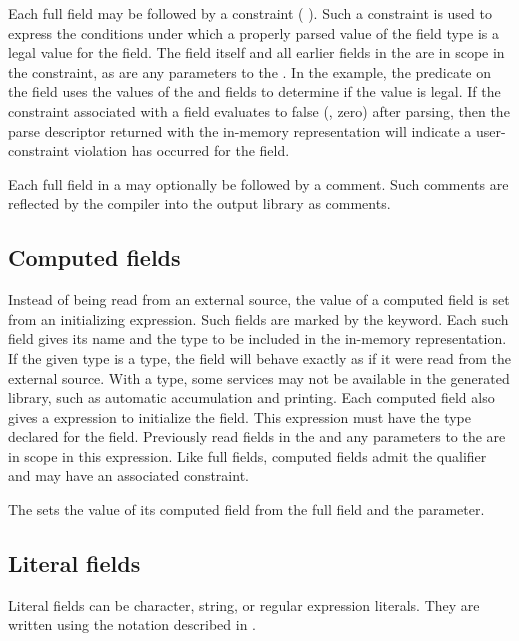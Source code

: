 Each full field may be followed by a constraint (\cf{}
).  Such a constraint is used to express
the conditions under which a properly parsed value of the field type
is a legal value for the field.  The field itself and all earlier
fields in the \Pstruct{} are in scope in the constraint, as are any
parameters to the \Pstruct{}.  In the example, the 
predicate on the  field uses the values of the 
and  fields to determine if the  value is
legal. 
If the constraint associated with a field evaluates to false
(\ie{}, zero) after parsing, then the parse descriptor returned with
the in-memory representation will indicate a user-constraint violation
has occurred for the field.

Each full field in a \Pstruct{} may optionally be followed by a \PADSL{}
comment. Such comments are reflected by the \PADS{} compiler into the
output library as comments. 

\subsection{Computed fields}
\label{sec:structs-computed-fields}
Instead of being read from an external source, the value of a
computed field is set from an initializing expression.  Such fields
are marked by the \Pcompute{} keyword.  Each such field gives its name
and the type to be included in the in-memory representation.  
If the given type is a \pads{} type, the field will behave exactly as
if it were read from the external source.  With a \C{} type, some
services may not be available in the generated library, such as
automatic accumulation and printing.
Each computed field
also gives a \C{} expression to initialize the field.  This expression
must have the type declared for the field.  
Previously read fields in the \Pstruct{} and any parameters
to the \Pstruct{} are in scope in this expression.
Like full fields, computed fields admit the \Pomit{} qualifier and may
have an associated constraint.

The  \Pstruct{} sets the value of its computed
field  from the full field  and the 
parameter. 


\subsection{Literal fields}
\label{sec:structs-literal-fields}
Literal fields can be character, string, or regular expression literals.  They are 
written using the notation described in .  

